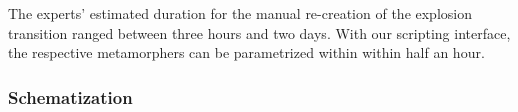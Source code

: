 The experts' estimated duration for the manual re-creation of the explosion transition ranged between three hours and two days. With our scripting interface, the respective metamorphers can be parametrized within within half an hour.




\subsubsection{Schematization}









